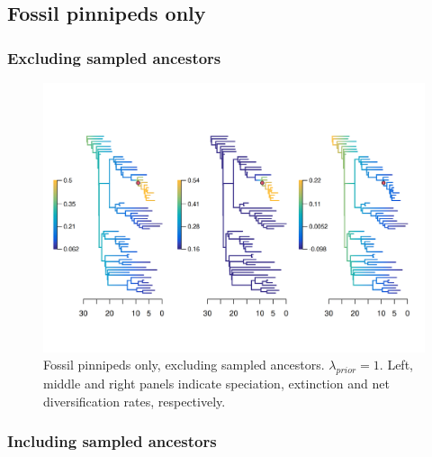 \documentclass[a4paper, 12pt]{article}
\begin{document}
\subsection{Fossil pinnipeds only}
\subsubsection{Excluding sampled ancestors}

\begin{figure}[H]
  \centering
  \includegraphics[width = \linewidth]{figures/diversification/fossil-only/sensitivity-analysis-fossil-only.png}
  \caption{Fossil pinnipeds only, excluding sampled ancestors. $\lambda_{prior} = 1$. Left, middle and right panels indicate speciation, extinction and net diversification rates, respectively.}
  \label{fig-fossil-only-noanc}
\end{figure}


\subsubsection{Including sampled ancestors}
\end{document}

